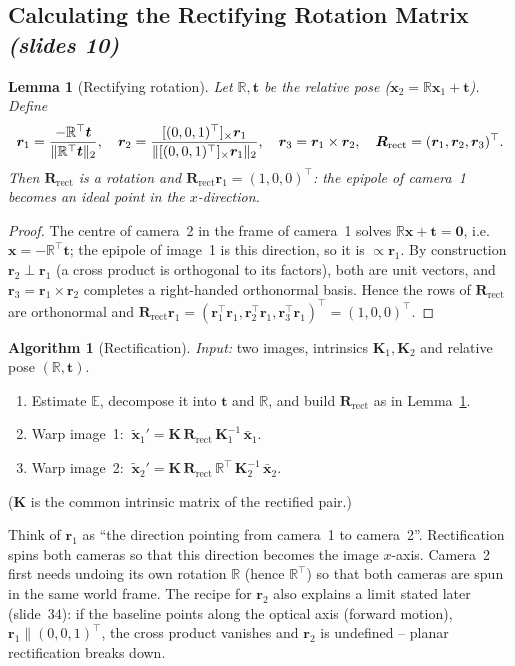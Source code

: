 \documentclass[11pt,a4paper]{article}
\newcommand{\slr}[1]{\texorpdfstring{\emph{(slides #1)}}{(slides #1)}}
\newcommand{\R}{\mathbb{R}}
\newcommand{\E}{\mathbb{E}}
\newcommand{\K}{\mathbf{K}}
\newcommand{\xt}{\tilde{\mathbf{x}}}
\newcommand{\xb}{\bar{\bm{x}}}
\newcommand{\vt}{\bm{t}}
\newcommand{\Rrect}{\bm{R}_{\mathrm{rect}}}
\theoremstyle{definition}
\newtheorem{algorithm}{Algorithm}[section]
\theoremstyle{plain}
\newtheorem{lemma}[definition]{Lemma}
\theoremstyle{remark}
\begin{document}
\subsection{Calculating the Rectifying Rotation Matrix \slr{10}}
\begin{lemma}[Rectifying rotation]\label{lem:rectrot}
Let $\R,\vt$ be the relative pose ($\bm x_2=\R\bm x_1+\vt$). Define
\[
\bm r_1=\frac{-\R^{\top}\vt}{\norm{\R^{\top}\vt}_2},\quad
\bm r_2=\frac{[(0,0,1)^{\top}]_\times\bm r_1}{\norm{[(0,0,1)^{\top}]_\times\bm r_1}_2},\quad
\bm r_3=\bm r_1\times\bm r_2,\quad
\Rrect=(\bm r_1,\bm r_2,\bm r_3)^{\top}.
\]
Then $\Rrect$ is a rotation and $\Rrect\bm r_1=(1,0,0)^{\top}$: the epipole of camera~1 becomes an ideal point in the $x$-direction.
\end{lemma}
\begin{proof}
The centre of camera~2 in the frame of camera~1 solves $\R\bm x+\vt=\bm 0$, i.e.\ $\bm x=-\R^{\top}\vt$; the epipole of image~1 is this direction, so it is $\propto\bm r_1$. By construction $\bm r_2\perp\bm r_1$ (a cross product is orthogonal to its factors), both are unit vectors, and $\bm r_3=\bm r_1\times\bm r_2$ completes a right-handed orthonormal basis. Hence the rows of $\Rrect$ are orthonormal and $\Rrect\bm r_1=(\bm r_1^{\top}\bm r_1,\bm r_2^{\top}\bm r_1,\bm r_3^{\top}\bm r_1)^{\top}=(1,0,0)^{\top}$.
\end{proof}
\begin{algorithm}[Rectification]
\emph{Input:} two images, intrinsics $\K_1,\K_2$ and relative pose $(\R,\vt)$.\par
\begin{enumerate}[leftmargin=*]
\item Estimate $\E$, decompose it into $\vt$ and $\R$, and build $\Rrect$ as in Lemma~\ref{lem:rectrot}.
\item Warp image~1: $\ \xt_1'=\K\,\Rrect\,\K_1^{-1}\,\xb_1$.
\item Warp image~2: $\ \xt_2'=\K\,\Rrect\,\R^{\top}\,\K_2^{-1}\,\xb_2$.
\end{enumerate}
($\K$ is the common intrinsic matrix of the rectified pair.)
\end{algorithm}
\begin{intuition}
Think of $\bm r_1$ as ``the direction pointing from camera~1 to camera~2''. Rectification spins both cameras so that this direction becomes the image $x$-axis. Camera~2 first needs undoing its own rotation $\R$ (hence $\R^{\top}$) so that both cameras are spun in the same world frame. The recipe for $\bm r_2$ also explains a limit stated later (slide~34): if the baseline points along the optical axis (forward motion), $\bm r_1\parallel(0,0,1)^{\top}$, the cross product vanishes and $\bm r_2$ is undefined -- planar rectification breaks down.
\end{intuition}
\end{document}
